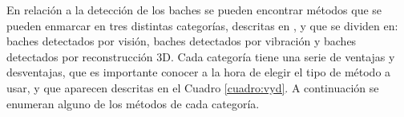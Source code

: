 
	


	


En relación a la detección de los baches se pueden encontrar métodos que se pueden enmarcar en tres distintas categorías, descritas en \cite{app12115320}, y que se dividen en: baches detectados por visión, baches detectados por vibración y baches detectados por reconstrucción 3D. Cada categoría tiene una serie de ventajas y desventajas, que es importante conocer a la hora de elegir el tipo de método a usar, y que aparecen descritas en el Cuadro \ref{cuadro:vyd}. A continuación se enumeran alguno de los métodos de cada categoría.

